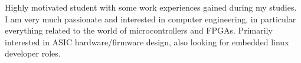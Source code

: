 

\begin{cvparagraph}

Highly motivated student with some work experiences gained during my studies.
I am very much passionate and interested in computer engineering, in particular everything related to the world of microcontrollers and FPGAs.
Primarily interested in ASIC hardware/firmware design, also looking for embedded linux developer roles. 

\end{cvparagraph}